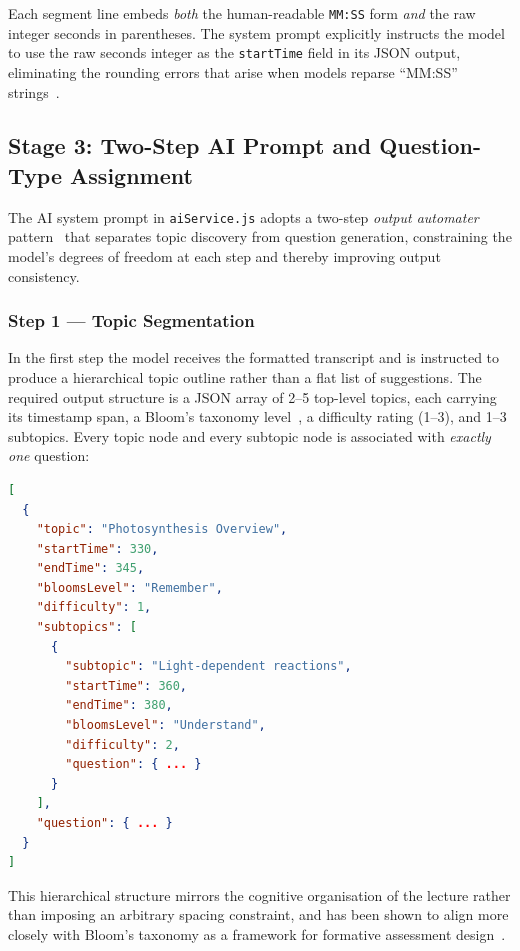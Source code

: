 Each segment line embeds \emph{both} the human-readable \texttt{MM:SS}
form \emph{and} the raw integer seconds in parentheses. The system prompt
explicitly instructs the model to use the raw seconds integer as the
\texttt{startTime} field in its JSON output, eliminating the rounding
errors that arise when models reparse ``MM:SS'' strings~\cite{white2023}.

\subsection{Stage 3: Two-Step AI Prompt and Question-Type Assignment}
\label{sec:stage3}

The AI system prompt in \texttt{aiService.js} adopts a two-step
\emph{output automater} pattern~\cite{white2023} that separates topic
discovery from question generation, constraining the model's degrees of
freedom at each step and thereby improving output consistency.

\subsubsection{Step 1 --- Topic Segmentation}

In the first step the model receives the formatted transcript and is
instructed to produce a hierarchical topic outline rather than a flat
list of suggestions. The required output structure is a JSON array of
2--5 top-level topics, each carrying its timestamp span, a Bloom's
taxonomy level~\cite{anderson2001}, a difficulty rating (1--3), and
1--3 subtopics. Every topic node and every subtopic node is associated
with \emph{exactly one} question:

\begin{lstlisting}[language=JSON,caption={Required JSON output structure for Step 1 (topic segmentation)}]
[
  {
    "topic": "Photosynthesis Overview",
    "startTime": 330,
    "endTime": 345,
    "bloomsLevel": "Remember",
    "difficulty": 1,
    "subtopics": [
      {
        "subtopic": "Light-dependent reactions",
        "startTime": 360,
        "endTime": 380,
        "bloomsLevel": "Understand",
        "difficulty": 2,
        "question": { ... }
      }
    ],
    "question": { ... }
  }
]
\end{lstlisting}

This hierarchical structure mirrors the cognitive organisation of the
lecture rather than imposing an arbitrary spacing constraint, and has
been shown to align more closely with Bloom's taxonomy as a framework for
formative assessment design~\cite{anderson2001}.

